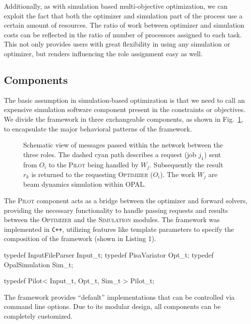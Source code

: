 \documentclass[%
reprint,
amsmath,amssymb,
aps,
prstab,
]{revtex4-1}
\begin{document}
Additionally, as with simulation based multi-objective optimization, we can
  exploit the fact that both the optimizer and simulation part of the process
  use a certain amount of resources.
The ratio of work between optimizer and simulation costs can be reflected in
  the ratio of number of processors assigned to each task.
This not only provides users with  great flexibility in using any simulation
  or optimizer, but renders influencing the role assignment easy as well.


\subsection{Components}

The basic assumption in simulation-based optimization is that we need to
  call an expensive simulation software component present in the
  constraints or objectives.
We divide the framework in three exchangeable components, as shown in
  Fig.~\ref{fig:opt-framework-layout}, to encapsulate the major behavioral
  patterns of the framework.
%
\begin{figure}
  \centering
  \scalebox{0.85}{
  \begin{tikzpicture}[text=black]
  
  \end{tikzpicture}
}
  

  \caption{Schematic view of messages passed within the network between the
    three roles.
  The dashed cyan path describes a request (job $j_1$) sent from $O_i$ to the
  \textsc{Pilot} being handled by $W_j$. Subsequently the result $r_k$ is
  returned to the requesting \textsc{Optimizer} ($O_i$). The work $W_j$ are beam dynamics 
  simulation within OPAL.}
  \label{fig:opt-framework-layout}
\end{figure}

%
The \textsc{Pilot} component acts as a bridge between the optimizer and
  forward solvers, providing the necessary functionality to handle passing
  requests and results between the \textsc{Optimizer} and the
  \textsc{Simulation} modules.
The framework was implemented in \texttt{C++}, utilizing features like template
  parameters to specify the composition of the framework (shown in Listing 1).

\begin{code}
typedef InputFileParser 	Input_t;
typedef PisaVariator        Opt_t;
typedef OpalSimulation      Sim_t;

typedef Pilot< Input_t, Opt_t, Sim_t > Pilot_t;
\end{code}
The framework provides ``default'' implementations that can be controlled via
  command line options.
Due to its modular design, all components can be completely customized.
\end{document}
